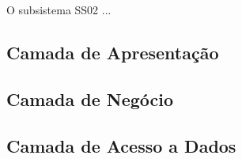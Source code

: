 O subsistema SS02 ...



\subsection{Camada de Apresentação}
\label{sec-componentes-ss02-apresentacao}



\subsection{Camada de Negócio}
\label{sec-componentes-ss02-negocio}



\subsection{Camada de Acesso a Dados}
\label{sec-componentes-ss02-dados}

